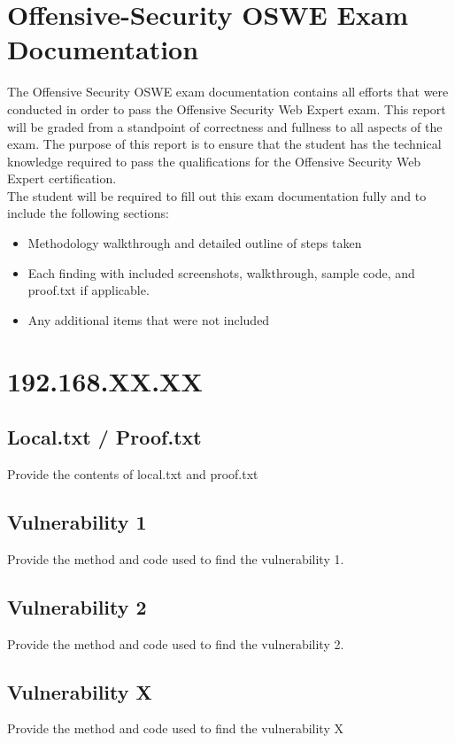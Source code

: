 \documentclass[a4paper]{article}
\begin{document}
\section{Offensive-Security OSWE Exam Documentation}

The Offensive Security OSWE exam documentation contains all efforts that were conducted in order to pass the Offensive Security Web Expert exam. This report will be graded from a standpoint of correctness and fullness to all aspects of the exam. The purpose of this report is to ensure that the student has the technical knowledge required to pass the qualifications for the Offensive Security Web Expert certification.
\\
The student will be required to fill out this exam documentation fully and to include the following sections:

\begin{itemize}
  \item Methodology walkthrough and detailed outline of steps taken
  \item Each finding with included screenshots, walkthrough, sample code, and proof.txt if applicable.
  \item Any additional items that were not included
\end{itemize}

\section{192.168.XX.XX}

\subsection{Local.txt / Proof.txt }
Provide the contents of local.txt and proof.txt

\subsection{Vulnerability 1}
Provide the method and code used to find the vulnerability 1.

\subsection{Vulnerability 2}
Provide the method and code used to find the vulnerability 2.

\subsection{Vulnerability X}
Provide the method and code used to find the vulnerability X
\end{document}
